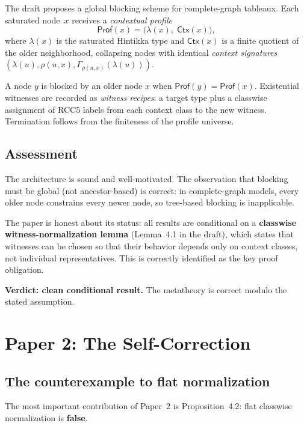 \documentclass[a4paper,11pt]{article}
\theoremstyle{definition}
\newcommand{\Prof}{\ensuremath{\mathsf{Prof}}}
\begin{document}
The draft proposes a global blocking scheme for complete-graph
tableaux.  Each saturated node~$x$ receives a \emph{contextual
profile}
\[
  \Prof(x) = \bigl(\lambda(x),\; \mathsf{Ctx}(x)\bigr),
\]
where $\lambda(x)$ is the saturated Hintikka type and
$\mathsf{Ctx}(x)$ is a finite quotient of the older neighborhood,
collapsing nodes with identical \emph{context signatures}
$(\lambda(u), \rho(u,x), \Gamma_{\rho(u,x)}(\lambda(u)))$.

A node $y$ is blocked by an older node $x$ when $\Prof(y) =
\Prof(x)$.  Existential witnesses are recorded as \emph{witness
recipes}: a target type plus a classwise assignment of RCC5 labels
from each context class to the new witness.  Termination follows from
the finiteness of the profile universe.

\subsection{Assessment}

The architecture is sound and well-motivated.  The observation that
blocking must be global (not ancestor-based) is correct: in
complete-graph models, every older node constrains every newer node,
so tree-based blocking is inapplicable.

The paper is honest about its status: all results are conditional on
a \textbf{classwise witness-normalization lemma} (Lemma~4.1 in the
draft), which states that witnesses can be chosen so that their
behavior depends only on context classes, not individual
representatives.  This is correctly identified as the key proof
obligation.

\textbf{Verdict: clean conditional result.}  The metatheory is
correct modulo the stated assumption.


\section{Paper 2: The Self-Correction}
\label{sec:paper2}

\subsection{The counterexample to flat normalization}

The most important contribution of Paper~2 is
Proposition~4.2: flat classwise normalization is \textbf{false}.
\end{document}
